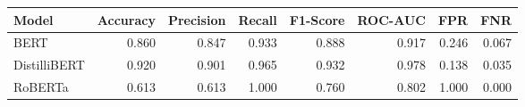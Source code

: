 \begin{tabular}{|l||r|r|r|r|r|r|r|}
\toprule
Model & \textbf{Accuracy} & \textbf{Precision} & Recall & \textbf{F1-Score} & \textbf{ROC-AUC} & \textbf{FPR} & FNR \\
\midrule \midrule
BERT & 0.860 & 0.847 & 0.933 & 0.888 & 0.917 & 0.246 & 0.067 \\
DistilliBERT & 0.920 & 0.901 & 0.965 & 0.932 & 0.978 & 0.138 & 0.035 \\
RoBERTa & 0.613 & 0.613 & 1.000 & 0.760 & 0.802 & 1.000 & 0.000 \\
\bottomrule
\end{tabular}
